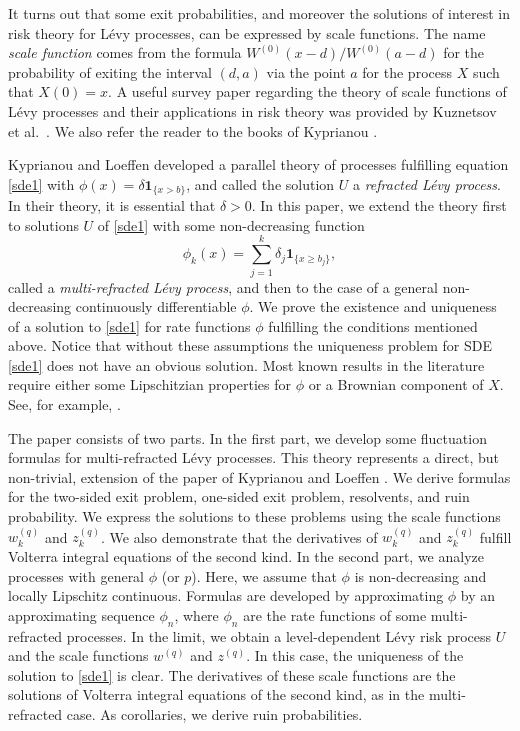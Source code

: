 \documentclass[12pt,reqno]{amsart}
\newcommand{\blue}{\textcolor[rgb]{0.00,0.00,1.00}}
\theoremstyle{definition}
\theoremstyle{remark}
\newcommand{\ind}{\mathbf{1}}
\begin{document}
It turns out that some exit probabilities, and moreover the solutions
of interest in risk theory for  L\'evy processes, can be expressed by scale functions. The name {\it scale function} comes from the formula $W^{(0)}(x-d)/W^{(0)}(a-d)$ 
for the probability of exiting the interval $(d,a)$ via the point $a$ for the process $X$ such that $X(0)=x$. %
A useful survey paper regarding the theory of scale functions of L\'evy processes and their applications in risk theory was provided by 
Kuznetsov et al.\ \cite{kuznetsovetal2012}. We also refer the reader to the books of Kyprianou \cites{kyprianou2006, kyprianou2014}. %




Kyprianou and Loeffen \cite{kyprianouloeffen2010} developed a parallel theory of processes fulfilling equation \eqref{sde1} with 
$\phi(x)=\delta\ind_{\{x>b\}}$, and called the solution $U$ a {\it refracted L\'evy process}.
In their theory, it is essential that $\delta>0$. In this paper, we extend the theory first to solutions $U$ of \eqref{sde1} with some non-decreasing 
function 
\begin{equation}\label{rate_function-mult}
\phi_k(x)=\sum_{j=1}^k\delta_j\ind_{\{x\ge b_j\}},
\end{equation}
called a \textit{multi-refracted L\'evy process}, and then to the case of a general non-decreasing continuously differentiable  $\phi$. 
We prove the existence and  uniqueness of a solution to \eqref{sde1} for rate functions $\phi$ fulfilling the conditions mentioned above. 
Notice that without these assumptions the uniqueness problem for SDE \eqref{sde1} does not have an obvious solution.
Most known results in the literature require either some Lipschitzian properties for $\phi$ or a Brownian component of $X$. See, for example, \cite{Situ}. 


The paper consists of two parts. In the first part, we develop some fluctuation formulas for multi-refracted L\'evy processes.
This theory represents a direct, but non-trivial, extension of the paper of Kyprianou and Loeffen \cite{kyprianouloeffen2010 }. We derive formulas for {the} two-sided exit problem, 
one-sided exit problem, resolvents, and ruin probability. We express the solutions to these problems using the scale functions  $w_k^{(q)}$ and $z_k^{(q)}$. 
We also demonstrate that the derivatives of  $w_k^{(q)}$ and $z_k^{(q)}$ fulfill Volterra integral equations of the second kind.
In the second part, we analyze processes with general $\phi$ (or $p$). Here, we assume that $\phi$ is non-decreasing and locally Lipschitz continuous. 
Formulas are developed by approximating $\phi$ by  an approximating sequence $\phi_n$, where $\phi_n$ are the rate functions
of some multi-refracted processes. In the limit, we obtain a level-dependent L\'evy risk process $U$
and the scale functions $w^{(q)}$ and $z^{(q)}$. In this case, the uniqueness of the solution to \eqref{sde1} is clear. 
The derivatives of these scale functions are the solutions of Volterra integral equations of the second kind, as in the multi-refracted case.
As corollaries, we derive ruin probabilities.
\end{document}
